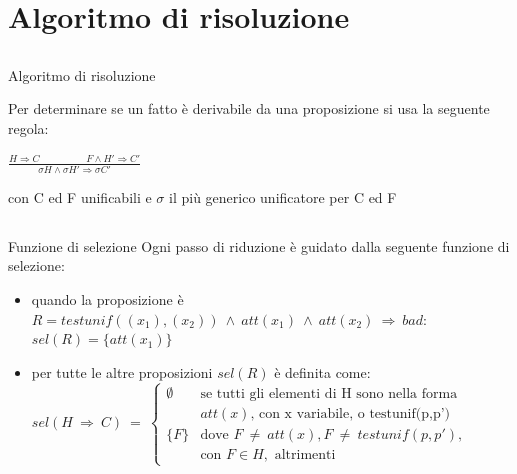 \documentclass[11pt,xcolor=table]{beamer}
\begin{document}
\section{Algoritmo di risoluzione}
\subsection{}
\begin{frame}{Algoritmo di risoluzione}
    \begin{block}{}
        Per determinare se un fatto è derivabile da una proposizione si usa la seguente regola:\\
        \begin{center}
            $\frac{H\Rightarrow C \hspace{2cm} F \land H' \Rightarrow C'}{\sigma H \land \sigma H' \Rightarrow \sigma C'}$
        \end{center}
        con C ed F unificabili e $\sigma$ il più generico unificatore per C ed F
    \end{block}
\end{frame}

\subsection{}
\begin{frame}{Funzione di selezione}
    Ogni passo di riduzione è guidato dalla seguente funzione di selezione:\\
    \begin{itemize}
    \item quando la proposizione è \\$R = testunif((x_1),(x_2))\ \land \ att(x_1)\ \land \ att(x_2)\ \Rightarrow \ bad$:\\
    
    $sel(R) = \{att(x_1)\}$
    \item per tutte le altre proposizioni $sel(R)$ è definita come:\\
    
    $
    sel(H\ \Rightarrow \ C)\ =\  
    \begin{cases} 
    \emptyset & \text{se tutti gli elementi di H sono nella forma } \\
    &  att(x) \text{, con x variabile, o testunif(p,p')} \\
    \{F\} & \text{dove } F\ \neq \ att(x), F\ \neq \ testunif(p,p'),\\
    & \text{con } F \in H, \text{ altrimenti}
    \end{cases}
   $
 \end{itemize}
\end{frame}
\end{document}
